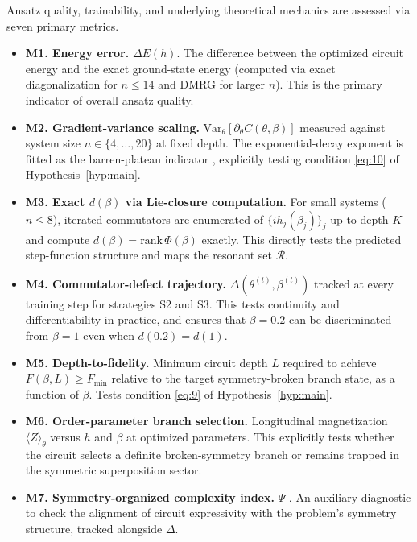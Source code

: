 \documentclass[pdflatex,sn-mathphys-num]{sn-jnl}
\theoremstyle{thmstyleone}
\theoremstyle{thmstyletwo}
\theoremstyle{thmstylethree}
\begin{document}
Ansatz quality, trainability, and underlying theoretical mechanics are assessed via seven primary metrics.
\begin{itemize}
    \item \textbf{M1. Energy error.} $\Delta E(h)$. The difference between the optimized circuit energy and the exact ground-state energy (computed via exact diagonalization for $n \le 14$ and DMRG for larger $n$). This is the primary indicator of overall ansatz quality.
    \item \textbf{M2. Gradient-variance scaling.} $\text{Var}_\theta[\partial_\theta C(\theta, \beta)]$ measured against system size $n \in \{4,\ldots,20\}$ at fixed depth. The exponential-decay exponent is fitted as the barren-plateau indicator \cite{holmes2022connecting,lan2026dla}, explicitly testing condition \eqref{eq:10} of Hypothesis~\ref{hyp:main}.
    \item \textbf{M3. Exact $d(\beta)$ via Lie-closure computation.} For small systems ($n \le 8$), iterated commutators are enumerated of $\{i h_j(\beta_j)\}_j$ up to depth $K$ and compute $d(\beta) = \text{rank}\, \Phi(\beta)$ exactly. This directly tests the predicted step-function structure and maps the resonant set $\mathcal{R}$.
    \item \textbf{M4. Commutator-defect trajectory.} $\Delta(\theta^{(t)}, \beta^{(t)})$ tracked at every training step for strategies S2 and S3. This tests continuity and differentiability in practice, and ensures that $\beta=0.2$ can be discriminated from $\beta=1$ even when $d(0.2)=d(1)$.
    \item \textbf{M5. Depth-to-fidelity.} Minimum circuit depth $L$ required to achieve $F(\beta, L) \ge F_{\text{min}}$ relative to the target symmetry-broken branch state, as a function of $\beta$. Tests condition \eqref{eq:9} of Hypothesis~\ref{hyp:main}.
    \item \textbf{M6. Order-parameter branch selection.} Longitudinal magnetization $\langle Z \rangle_\theta$ versus $h$ and $\beta$ at optimized parameters. This explicitly tests whether the circuit selects a definite broken-symmetry branch or remains trapped in the symmetric superposition sector.
    \item \textbf{M7. Symmetry-organized complexity index.} $\Psi$ \cite{meyer2023exploiting,schatzki2022theoretical}. An auxiliary diagnostic to check the alignment of circuit expressivity with the problem's symmetry structure, tracked alongside $\Delta$.
\end{itemize}
\end{document}
